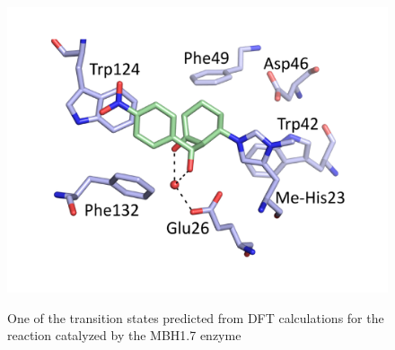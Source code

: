 \documentclass[%
preprint,
 amsmath,amssymb,
 aps,
prb,
]{revtex4-2}
\begin{document}
%
\begin{figure}[ht!]
\centering
\includegraphics[scale=0.35]{figures/exp-ts1.pdf}
\label{fig:exp-ts1}
\caption{One of the transition states predicted from DFT calculations for the reaction catalyzed by the MBH1.7 enzyme}
\end{figure}
\end{document}
